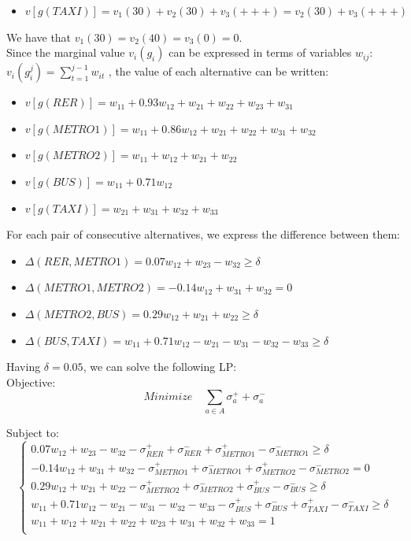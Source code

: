 \documentclass{report}
\begin{document}
\begin{appendices}
\begin{itemize}
\item $v[g(TAXI)]= v_1 (30) + v_2(30) + v_3(+++) = v_2(30) + v_3(+++)$
\end{itemize}
We have that $v_1(30) = v_2(40) = v_3(0) = 0$. \\
Since the marginal value $v_i(g_i)$ can be expressed in terms of variables $w_{ij}$: $v_i(g_i^{j}) = \sum _{t=1}^{j-1} w_{it}$ , the value of each alternative can be written: 
\begin{itemize}
\item $v[g(RER)]= w_{11} + 0.93 w_{12} + w_{21} + w_{22} + w_{23} + w_{31}$
\item $v[g(METRO1)]=w_{11} + 0.86 w_{12} + w_{21} + w_{22} + w_{31} + w_{32}$
\item $v[g(METRO2)]= w_{11} + w_{12} + w_{21} + w_{22} $
\item $v[g(BUS)]= w_{11} + 0.71 w_{12}$
\item $v[g(TAXI)]= w_{21} + w_{31} + w_{32} + w_{33}$
\end{itemize}
For each pair of consecutive alternatives, we express the difference between them: 
\begin{itemize}
\item $\Delta (RER, METRO1) = 0.07 w_{12} + w_{23} - w_{32} \geq \delta$
\item $\Delta (METRO1, METRO2) = -0.14 w_{12} + w_{31} + w_{32}  = 0$
\item $\Delta (METRO2, BUS) = 0.29 w_{12} + w_{21} + w_{22} \geq \delta$
\item $\Delta (BUS, TAXI) = w_{11} + 0.71w_{12} - w_{21} - w_{31} - w_{32} - w_{33} \geq \delta$
\end{itemize}
Having $\delta = 0.05$, we can solve the following LP:\\

Objective:  
\begin{equation}
	Minimize \quad \sum_{a \in A} \sigma _{a}^{+} + \sigma _{a}^{-}
\end{equation}

Subject to: \\
\begin{equation}
	\begin{cases}
		0.07 w_{12} + w_{23} - w_{32}  -\sigma _{RER}^{+} +\sigma _{RER}^{-} +\sigma _{METRO1}^{+} - \sigma _{METRO1}^{-}\geq \delta\\
		-0.14 w_{12} + w_{31} + w_{32}  -\sigma _{METRO1}^{+} +\sigma _{METRO1}^{-} +\sigma _{METRO2}^{+} - \sigma _{METRO2}^{-} = 0  \\
		 0.29 w_{12} + w_{21} + w_{22}  -\sigma _{METRO2}^{+} +\sigma _{METRO2}^{-} +\sigma _{BUS}^{+} - \sigma _{BUS}^{-} \geq \delta\\
		w_{11} + 0.71w_{12} - w_{21} - w_{31} - w_{32} - w_{33} -\sigma _{BUS}^{+} +\sigma _{BUS}^{-} +\sigma _{TAXI}^{+} - \sigma _{TAXI}^{-} \geq \delta\\
		w_{11} + w_{12} + w_{21} + w_{22} + w_{23} + w_{31} + w_{32} + w_{33} = 1\\


\end{cases}
\end{equation}
\end{appendices}
\end{document}

